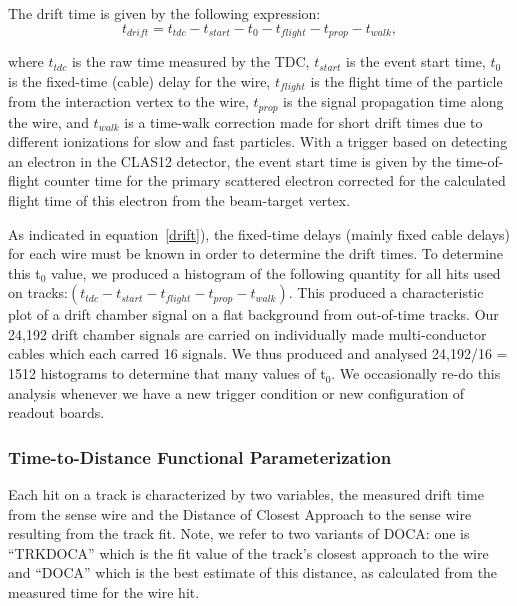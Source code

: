The drift time is given by the following expression:
\begin{equation} 
\label{drift}
t_{drift} = t_{tdc} - t_{start} - t_{0} - t_{flight} - t_{prop} - t_{walk},
\end{equation}

\noindent
where $t_{tdc}$ is the raw time measured by the TDC, $t_{start}$ is the event start time, 
$t_0$ is the fixed-time (cable) delay for the wire, $t_{flight}$ is the 
flight time of the particle from the interaction vertex to the wire, $t_{prop}$ 
is the signal propagation time along the wire, and $t_{walk}$ is a time-walk 
correction made for short drift times due to different ionizations for slow 
and fast particles.  
With a trigger based on detecting an electron in the CLAS12 detector, the event start time is 
given by the time-of-flight counter time for the primary scattered electron 
corrected for the calculated flight time of this electron from the beam-target vertex.

As indicated in equation~\ref{drift}), the fixed-time delays (mainly fixed cable delays) 
for each wire must be known in order to determine the drift times.   To determine
this t$_0$ value, we produced a histogram of the following quantity for all hits
used on tracks:$ ( t_{tdc} - t_{start} - t_{flight} - t_{prop} - t_{walk} )$.
This produced a characteristic plot of a drift chamber signal on a flat
background from out-of-time tracks.  Our 24,192 drift chamber signals are carried
on individually made multi-conductor cables which each carred 16 signals.  We thus
produced and analysed 24,192/16 = 1512 histograms to determine that many values of
t$_0$. We occasionally re-do this analysis whenever we have a new trigger condition
or new configuration of readout boards.


\subsubsection{Time-to-Distance Functional Parameterization}
\label{tdistcal}

\hskip 0.15in
Each hit on a track is characterized by two variables, the measured drift 
time from the sense wire and the Distance of Closest Approach to the 
sense wire resulting from the track fit. 
Note, we refer to two variants of DOCA: one is ``TRKDOCA'' which is the
fit value of the track's closest approach to the wire and ``DOCA''
which is the best estimate of this distance, as calculated from the measured 
time for the wire hit.
 
